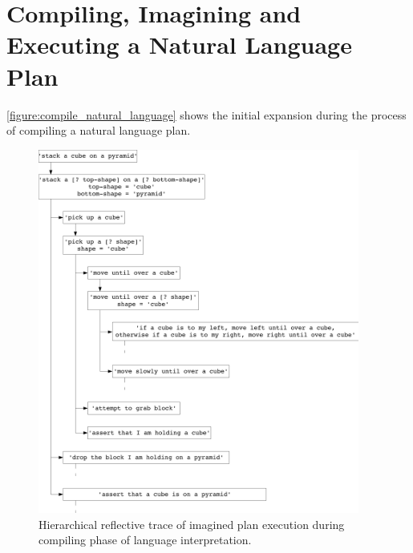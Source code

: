 \section{Compiling, Imagining and Executing a Natural Language Plan}

{\mbox{\autoref{figure:compile_natural_language}}} shows the initial
expansion during the process of compiling a natural language plan.
\begin{figure}
\centering
\includegraphics[height=12cm]{gfx/compile_natural_language}
\caption[Hierarchical reflective trace of imagined plan execution
  during compiling phase of language interpretation.]{Hierarchical
  reflective trace of imagined plan execution during compiling phase
  of language interpretation.}
\label{figure:compile_natural_language}
\end{figure}
